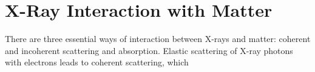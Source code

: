  
\section{X-Ray Interaction with Matter}\label{sec:Q2}

There are three essential ways of interaction between X-rays and matter: coherent and incoherent scattering and absorption. Elastic scattering of X-ray photons with electrons leads to coherent scattering, which 